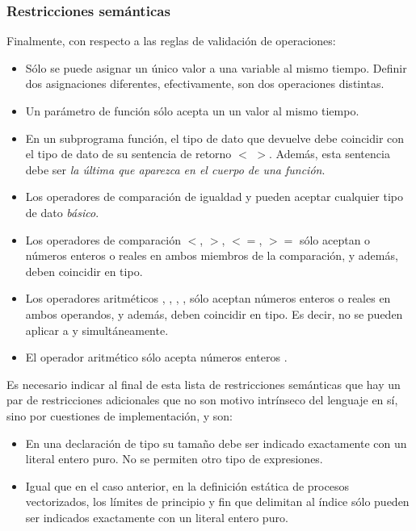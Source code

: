 \subsubsection{Restricciones semánticas}\label{subsubsec:restriccionesSemanticas}
Finalmente, con respecto a las reglas de validación de operaciones:
\begin{itemize}
    \item Sólo se puede asignar un único valor a una variable al mismo tiempo. Definir dos asignaciones diferentes, efectivamente, son dos operaciones distintas.
    \item Un parámetro de función sólo acepta un un valor al mismo tiempo.
    \item En un subprograma función, el tipo de dato que devuelve debe coincidir con el tipo de dato de su sentencia de retorno $<$  $>$. Además, esta sentencia  debe ser \textit{la última que aparezca en el cuerpo de una función}.
    \item Los operadores de comparación de igualdad \code{\!=} y \code{==} pueden aceptar cualquier tipo de dato \textit{básico}.
    \item Los operadores de comparación $<$, $>$, $<=$, $>=$ sólo aceptan o números enteros  o reales  en ambos miembros de la comparación, y además, deben coincidir en tipo.
    \item Los operadores aritméticos \code{+}, \code{-}, \code{*}, \code{/}, sólo aceptan números enteros  o reales  en ambos operandos, y además, deben coincidir en tipo. Es decir, no se pueden aplicar a  y  simultáneamente.
    \item El operador aritmético \code{\%} sólo acepta números enteros .
\end{itemize}

\vspace{0.5cm}

Es necesario indicar al final de esta lista de restricciones semánticas que hay un par de restricciones adicionales que no son motivo intrínseco del lenguaje en sí, sino por cuestiones de implementación, y son:

\begin{itemize}
    \item En una declaración de tipo  su tamaño debe ser indicado exactamente con un literal entero puro. No se permiten otro tipo de expresiones.
    \item Igual que en el caso anterior, en la definición estática de procesos vectorizados, los límites de principio y fin que delimitan al índice sólo pueden ser indicados exactamente con un literal entero puro.
\end{itemize}

